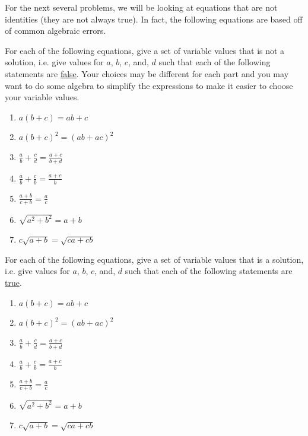 For the next several problems, we will be looking at equations that are not identities (they are not always true). In fact, the following equations are based off of common algebraic errors.

\bq For each of the following equations, give a set of variable values that is not a solution, i.e. give values for $a$, $b$, $c$, and, $d$ such that each of the following statements are \underline{false}. Your choices may be different for each part and you may want to do some algebra to simplify the expressions to make it easier to choose your variable values.
\begin{enumerate}
\item $a(b+c)=ab+c$
\item $a(b+c)^2 =(ab+ac)^2$
\item $\frac{a}{b}+\frac{c}{d} =\frac{a+c}{b+d}$
\item $\frac{a}{b}+\frac{c}{b} =\frac{a+c}{b}$
\item $\frac{a+b}{c+b}=\frac{a}{c}$
\item $\sqrt{a^2+b^2}=a+b$
\item $c \sqrt{a+b}=\sqrt{ca+cb}$
\end{enumerate}
\eq

\bq For each of the following equations, give a set of variable values that is a solution, i.e. give values for $a$, $b$, $c$, and, $d$ such that each of the following statements are \underline{true}.
\begin{enumerate}
\item $a(b+c)=ab+c$
\item $a(b+c)^2 =(ab+ac)^2$
\item $\frac{a}{b}+\frac{c}{d} =\frac{a+c}{b+d}$
\item $\frac{a}{b}+\frac{c}{b} =\frac{a+c}{b}$
\item $\frac{a+b}{c+b}=\frac{a}{c}$
\item $\sqrt{a^2+b^2}=a+b$
\item $c \sqrt{a+b}=\sqrt{ca+cb}$
\end{enumerate}
\eq



